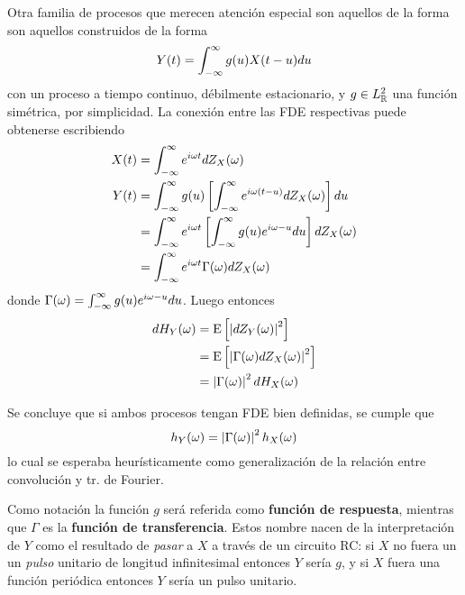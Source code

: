 Otra familia de procesos que merecen atención especial son aquellos de la forma son aquellos 
construidos de la forma
\begin{equation}
Y(t) = \int_{-\infty}^{\infty} g(u) X(t-u) du
\end{equation}
%
con \xt un proceso a tiempo continuo, débilmente estacionario, y $g\in L^{2}_{\mathbb{R}}$ una función 
simétrica, por simplicidad. 
%
La conexión entre las FDE respectivas puede obtenerse escribiendo
\begin{align*}
X(t) &= \int_{-\infty}^{\infty} e^{i \omega t }  dZ_X(\omega) \\
Y(t) &= \int_{-\infty}^{\infty} g(u) \left[ \int_{-\infty}^{\infty} e^{i \omega (t-u) }  dZ_X(\omega) \right] du \\
&= \int_{-\infty}^{\infty} e^{i \omega t } \left[ \int_{-\infty}^{\infty} g(u) e^{i \omega -u } du \right] dZ_X(\omega) \\
&= \int_{-\infty}^{\infty} e^{i \omega t } \Gamma(\omega) dZ_X(\omega)
\end{align*}
donde $\Gamma(\omega) = \int_{-\infty}^{\infty} g(u) e^{i \omega -u } du$. 
%
Luego entonces
\begin{align*}
dH_Y(\omega) &= \mathrm{E}\left[ \left| dZ_Y(\omega) \right|^{2} \right]  \\
&= \mathrm{E}\left[ \left| \Gamma(\omega) dZ_X(\omega) \right|^{2} \right]  \\
&= \left| \Gamma(\omega) \right|^{2} dH_X(\omega)
\end{align*}

Se concluye que si ambos procesos tengan FDE bien definidas, se cumple que
\begin{equation}
h_Y(\omega) = \left| \Gamma(\omega) \right|^{2} h_X(\omega)
\end{equation}
%
lo cual se esperaba heurísticamente como generalización de la relación entre convolución y tr. de
Fourier.

Como notación la función $g$ será referida como \textbf{función de respuesta}, mientras que 
$\Gamma$ es la \textbf{función de transferencia}. 
%
Estos nombre nacen de la interpretación de $Y$ como el resultado de \textit{pasar} a $X$ a través 
de un circuito RC:
si $X$ no fuera un un \textit{pulso} unitario de longitud infinitesimal entonces $Y$ sería $g$,
y si $X$ fuera una función periódica entonces $Y$ sería un pulso unitario.

